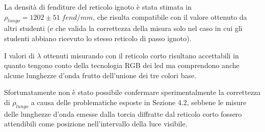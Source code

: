 \documentclass{article}
\begin{document}
La densità di fenditure del reticolo ignoto è stata stimata in $\rho_{lungo} = 1202 \pm 51 \; fend/mm$, che risulta compatibile con il valore ottenuto da altri studenti (e che valida la correttezza della misura solo nel caso in cui gli studenti abbiano ricevuto lo stesso reticolo di passo ignoto). 

\vspace{3mm}

I valori di $\lambda$ ottenuti misurando con il reticolo corto risultano accettabili in quanto tengono conto della tecnologia RGB dei led ma comprendono anche alcune lunghezze d'onda frutto dell'unione dei tre colori base.

\vspace{3mm}

Sfortunatamente non è stato possibile confermare sperimentalmente la correttezza di $\rho_{lungo}$ a causa delle problematiche esposte in Sezione 4.2, sebbene le misure delle lunghezze d'onda emesse dalla torcia diffratte dal reticolo corto fossero attendibili come posizione nell'intervallo della luce visibile.
\end{document}

